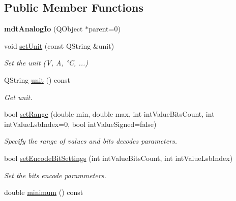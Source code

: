 \subsection*{Public Member Functions}
\begin{DoxyCompactItemize}
\item 
\hypertarget{classmdt_analog_io_affcdf039a10023b495cf49a5f476f829}{
{\bfseries mdtAnalogIo} (QObject $\ast$parent=0)}
\label{classmdt_analog_io_affcdf039a10023b495cf49a5f476f829}

\item 
\hypertarget{classmdt_analog_io_afb4cd82bee1ac1e77148c8621b1c66fa}{
void \hyperlink{classmdt_analog_io_afb4cd82bee1ac1e77148c8621b1c66fa}{setUnit} (const QString \&unit)}
\label{classmdt_analog_io_afb4cd82bee1ac1e77148c8621b1c66fa}

\begin{DoxyCompactList}\small\item\em Set the unit (V, A, °C, ...) \end{DoxyCompactList}\item 
\hypertarget{classmdt_analog_io_a126d5b9bf4a0bb9ce9f2ff6a010fef0e}{
QString \hyperlink{classmdt_analog_io_a126d5b9bf4a0bb9ce9f2ff6a010fef0e}{unit} () const }
\label{classmdt_analog_io_a126d5b9bf4a0bb9ce9f2ff6a010fef0e}

\begin{DoxyCompactList}\small\item\em Get unit. \end{DoxyCompactList}\item 
bool \hyperlink{classmdt_analog_io_ab5733c8d4f49da6e6d4f11f1e1aa9555}{setRange} (double min, double max, int intValueBitsCount, int intValueLsbIndex=0, bool intValueSigned=false)
\begin{DoxyCompactList}\small\item\em Specify the range of values and bits decodes parameters. \end{DoxyCompactList}\item 
bool \hyperlink{classmdt_analog_io_a2263d9b0bf2c1b998386c590866f06e8}{setEncodeBitSettings} (int intValueBitsCount, int intValueLsbIndex)
\begin{DoxyCompactList}\small\item\em Set the bits encode parammeters. \end{DoxyCompactList}\item 
\hypertarget{classmdt_analog_io_acd2b8cb33d5d42abf23672ad7675825e}{
double \hyperlink{classmdt_analog_io_acd2b8cb33d5d42abf23672ad7675825e}{minimum} () const }
\label{classmdt_analog_io_acd2b8cb33d5d42abf23672ad7675825e}


\end{DoxyCompactItemize}
